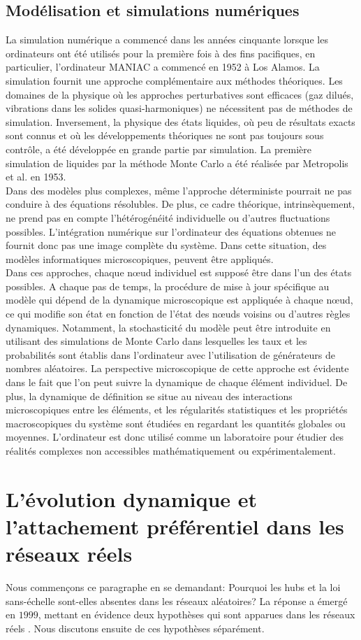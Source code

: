 \subsection{Modélisation et simulations numériques}
La simulation numérique a commencé dans les années cinquante lorsque les ordinateurs ont été utilisés pour la première fois à des fins pacifiques, en particulier, l'ordinateur MANIAC a commencé en 1952 à Los Alamos. La simulation fournit une approche complémentaire aux méthodes théoriques. Les domaines de la physique où les approches perturbatives sont efficaces (gaz dilués, vibrations dans les solides quasi-harmoniques) ne nécessitent pas de méthodes de simulation. Inversement, la physique des états liquides, où peu de résultats exacts sont connus et où les développements théoriques ne sont pas toujours sous contrôle, a été développée en grande partie par simulation. La première simulation de liquides par la méthode Monte Carlo a été réalisée par Metropolis et al. en 1953.\\
Dans des modèles plus complexes, même l'approche déterministe pourrait ne pas conduire à des équations résolubles. De plus, ce cadre théorique, intrinsèquement, ne prend pas en compte l'hétérogénéité individuelle ou d'autres fluctuations possibles. L'intégration numérique sur l'ordinateur des équations obtenues ne fournit donc pas une image complète du système. Dans cette situation, des modèles informatiques microscopiques, peuvent être appliqués.\\
Dans ces approches, chaque nœud individuel est supposé être dans l'un des états possibles. A chaque pas de temps, la procédure de mise à jour spécifique au modèle qui dépend de la dynamique microscopique est appliquée à chaque nœud, ce qui modifie son état en fonction de l'état des nœuds voisins ou d'autres règles dynamiques. Notamment, la stochasticité du modèle peut être introduite en utilisant des simulations de Monte Carlo dans lesquelles les taux et les probabilités sont établis dans l'ordinateur avec l'utilisation de générateurs de nombres aléatoires. La perspective microscopique de cette approche est évidente dans le fait que l'on peut suivre la dynamique de chaque élément individuel. De plus, la dynamique de définition se situe au niveau des interactions microscopiques entre les éléments, et les régularités statistiques et les propriétés macroscopiques du système sont étudiées en regardant les quantités globales ou moyennes. L'ordinateur est donc utilisé comme un laboratoire pour étudier des réalités complexes non accessibles mathématiquement ou expérimentalement.
\begin{sloppypar}
\section{L'évolution dynamique et l'attachement préférentiel  dans les réseaux réels}
\end{sloppypar}
Nous commençons ce paragraphe en se demandant: Pourquoi les hubs et la loi sans-échelle sont-elles absentes dans les réseaux aléatoires? La réponse a émergé en $1999$, mettant en évidence deux hypothèses qui sont apparues dans les réseaux réels \cite{BA1999}. Nous discutons ensuite de ces hypothèses séparément.

